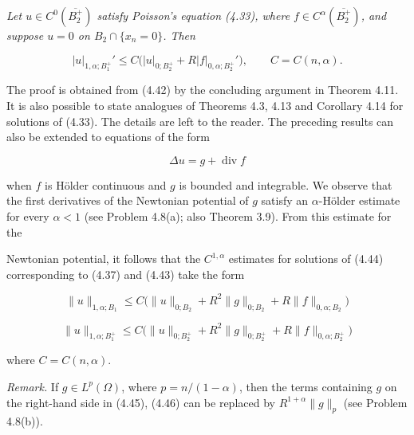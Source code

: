 \begin{theorem}\label{gt:thm-poisson-first-derivative-halfball}
\textit{Let $u\in C^0(\overline{B_2^+})$ satisfy Poisson's equation (4.33), where $f\in C^\alpha(\overline{B_2^+})$, and suppose $u=0$ on $B_2\cap\{x_n=0\}$. Then}

\begin{equation}
\tag{4.43}
|u|_{1,\alpha;B_1^+}'\le C\bigl(|u|_{0;B_2^+}+R|f|_{0,\alpha;B_2^+}'\bigr), \qquad C=C(n,\alpha).
\end{equation}

The proof is obtained from (4.42) by the concluding argument in Theorem 4.11.
It is also possible to state analogues of Theorems 4.3, 4.13 and Corollary 4.14 for solutions of (4.33). The details are left to the reader.
The preceding results can also be extended to equations of the form

\begin{equation}
\tag{4.44}
\Delta u=g+\operatorname{div}f
\end{equation}

when $f$ is Hölder continuous and $g$ is bounded and integrable. We observe that the first derivatives of the Newtonian potential of $g$ satisfy an $\alpha$-Hölder estimate for every $\alpha<1$ (see Problem 4.8(a); also Theorem 3.9). From this estimate for the


Newtonian potential, it follows that the $C^{1,\alpha}$ estimates for solutions of (4.44) corresponding to (4.37) and (4.43) take the form

\begin{equation}
\tag{4.45}
\|u\|_{1,\alpha;B_1} \leq C\bigl(\|u\|_{0;B_2} + R^2\|g\|_{0;B_2} + R\|f\|_{0,\alpha;B_2}\bigr)
\end{equation}

\begin{equation}
\tag{4.46}
\|u\|_{1,\alpha;B_1^+} \leq C\bigl(\|u\|_{0;B_2^+} + R^2\|g\|_{0;B_2^+} + R\|f\|_{0,\alpha;B_2^+}\bigr)
\end{equation}

where $C = C(n,\alpha)$.

\textit{Remark.} If $g \in L^p(\Omega)$, where $p = n/(1-\alpha)$, then the terms containing $g$ on the right-hand side in (4.45), (4.46) can be replaced by $R^{1+\alpha}\|g\|_p$ (see Problem 4.8(b)).
\end{theorem}

